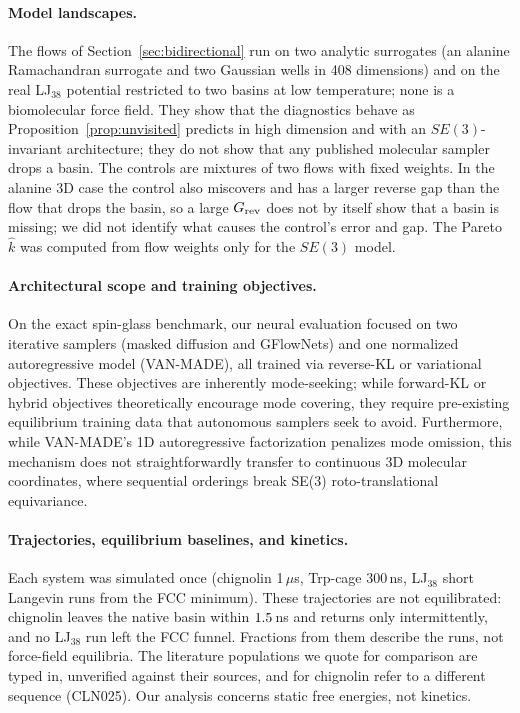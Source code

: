\paragraph{Model landscapes.}
The flows of Section~\ref{sec:bidirectional} run on two analytic surrogates (an alanine Ramachandran surrogate and two Gaussian wells in 408 dimensions) and on the real LJ$_{38}$ potential restricted to two basins at low temperature; none is a biomolecular force field. They show that the diagnostics behave as Proposition~\ref{prop:unvisited} predicts in high dimension and with an $SE(3)$-invariant architecture; they do not show that any published molecular sampler drops a basin. The controls are mixtures of two flows with fixed weights. In the alanine 3D case the control also miscovers and has a larger reverse gap than the flow that drops the basin, so a large $G_{\rm rev}$ does not by itself show that a basin is missing; we did not identify what causes the control's error and gap. The Pareto $\hat k$ was computed from flow weights only for the $SE(3)$ model.

\paragraph{Architectural scope and training objectives.}
On the exact spin-glass benchmark, our neural evaluation focused on two iterative samplers (masked diffusion and GFlowNets) and one normalized autoregressive model (VAN-MADE), all trained via reverse-KL or variational objectives. These objectives are inherently mode-seeking; while forward-KL or hybrid objectives theoretically encourage mode covering, they require pre-existing equilibrium training data that autonomous samplers seek to avoid. Furthermore, while VAN-MADE's 1D autoregressive factorization penalizes mode omission, this mechanism does not straightforwardly transfer to continuous 3D molecular coordinates, where sequential orderings break SE(3) roto-translational equivariance.

\paragraph{Trajectories, equilibrium baselines, and kinetics.}
Each system was simulated once (chignolin 1\,$\mu$s, Trp-cage 300\,ns, LJ$_{38}$ short Langevin runs from the FCC minimum). These trajectories are not equilibrated: chignolin leaves the native basin within $1.5$\,ns and returns only intermittently, and no LJ$_{38}$ run left the FCC funnel. Fractions from them describe the runs, not force-field equilibria. The literature populations we quote for comparison are typed in, unverified against their sources, and for chignolin refer to a different sequence (CLN025). Our analysis concerns static free energies, not kinetics.

